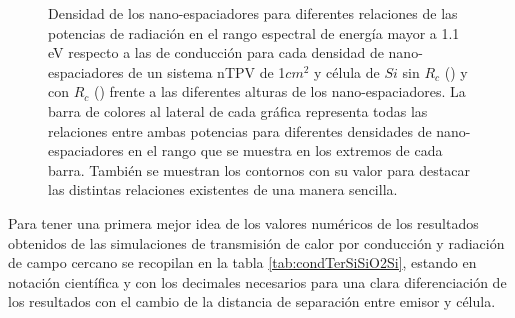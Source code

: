 \begin{figure}[H]
\begin{subfigure}[b]{0.49\textwidth}
	\caption{ }
	\label{fig:rel_SiSi11_Rc}
\end{subfigure}
\caption{\small Densidad de los nano-espaciadores para diferentes relaciones de las potencias de radiación en el rango espectral de energía mayor a 1.1 eV respecto a las de conducción para cada densidad de nano-espaciadores de un sistema nTPV de 1$cm^2$ y célula de $Si$ sin $R_c$ () y con $R_c$ () frente a las diferentes alturas de los nano-espaciadores. La barra de colores al lateral de cada gráfica representa todas las relaciones entre ambas potencias para diferentes densidades de nano-espaciadores en el rango que se muestra en los extremos de cada barra. También se muestran los contornos con su valor para destacar las distintas relaciones existentes de una manera sencilla.}
	\label{fig:rels_SiSi11}
\end{figure}
Para tener una primera mejor idea de los valores numéricos de los resultados obtenidos de las simulaciones de transmisión de calor por conducción y radiación de campo cercano se recopilan en la tabla \ref{tab:condTerSiSiO2Si}, estando en notación científica y con los decimales necesarios para una clara diferenciación de los resultados con el cambio de la distancia de separación entre emisor y célula.
